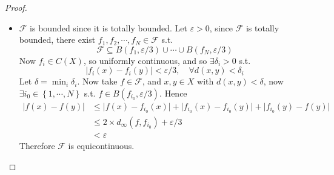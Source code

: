 \documentclass[11pt,a4paper]{article}
\theoremstyle{definition}
\theoremstyle{plain}
\theoremstyle{remark}
\renewcommand{\set}[1]{\left\{ #1 \right\}}
\newcommand{\abs}[1]{\lvert #1 \rvert}
\newcommand{\1}{\mathbbm{1}}
\begin{document}
\begin{proof}
    \begin{itemize}
        \item[$\implies$] $\mathcal{F}$ is bounded since it is totally bounded. Let $\varepsilon > 0$, since $\mathcal{F}$ is totally bounded, there exist $f_1, f_2, \cdots, f_N \in \mathcal{F}$ s.t. 
        $$\mathcal{F} \subseteq B(f_1, \varepsilon/3) \cup \cdots \cup B(f_N, \varepsilon/3)$$
        Now $f_i \in C(X)$, so uniformly continuous, and so $\exists \delta_i > 0$ s.t. 
        $$\abs{f_i(x) - f_i(y)} < \varepsilon/3, \quad \forall d(x,y) < \delta_i$$
        Let $\delta = \min_i \delta_i$. Now take $f \in \mathcal{F}$, and $x, y \in X$ with $d(x,y) < \delta$, now $\exists i_0 \in \set{1, \cdots, N}$ s.t. 
        $f \in B(f_{i_0}, \varepsilon/3)$. Hence 
        \begin{align*}
            \abs{f(x) - f(y)} &\le \abs{f(x) - f_{i_0}(x)} + \abs{f_{i_0}(x) - f_{i_0}(y)} + \abs{f_{i_0}(y) - f(y)} \\
            &\le 2 \times d_\infty(f, f_{i_0}) + \varepsilon/3 \\
            &< \varepsilon
        \end{align*} 
        Therefore $\mathcal{F}$ is equicontinuous.


\end{itemize}
\end{proof}
\end{document}
